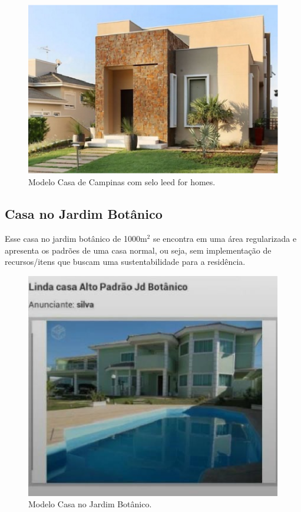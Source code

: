 \begin{figure}[H]
\begin{center}
\includegraphics[keepaspectratio,scale=0.6]{figuras/modelocasacampinas.eps}
\caption{Modelo Casa de Campinas com selo leed for homes.}
\end{center}
\end{figure}


\subsection{Casa no Jardim Botânico}

Esse casa no jardim botânico de 1000\si{\meter}$^2$ se encontra em uma área regularizada e apresenta os padrões de uma casa normal, ou seja, sem implementação de recursos/itens que buscam uma sustentabilidade para a residência.

\begin{figure}[H]
\begin{center}
\includegraphics[keepaspectratio,scale=0.6]{figuras/casajardimbotanico.eps}
\caption{Modelo Casa no Jardim Botânico.}
\end{center}
\end{figure}


